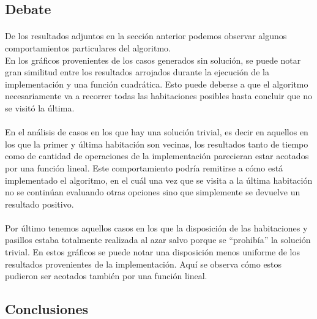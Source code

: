 \clearpage


\subsection{Debate}

\paragraph{}
De los resultados adjuntos en la sección anterior podemos observar algunos comportamientos particulares del algoritmo.\\
En los gráficos provenientes de los casos generados sin solución, se puede notar gran similitud entre los resultados arrojados durante la ejecución de la implementación y una función cuadrática. Esto puede deberse a que el algoritmo necesariamente va a recorrer todas las habitaciones posibles hasta concluir que no se visitó la última.

\paragraph{}
En el análisis de casos en los que hay una solución trivial, es decir en aquellos en los que la primer y última habitación son vecinas, los resultados tanto de tiempo como de cantidad de operaciones de la implementación parecieran estar acotados por una función lineal. Este comportamiento podría remitirse a cómo está implementado el algoritmo, en el cuál una vez que se visita a la última habitación no se continúan evaluando otras opciones sino que simplemente se devuelve un resultado positivo.

\paragraph{}
Por último tenemos aquellos casos en los que la disposición de las habitaciones y pasillos estaba totalmente realizada al azar salvo porque se ``prohibía'' la solución trivial. En estos gráficos se puede notar una disposición menos uniforme de los resultados provenientes de la implementación. Aquí se observa cómo estos pudieron ser acotados también por una función lineal.


\subsection{Conclusiones}

